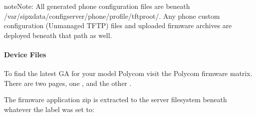 \documentclass[letterpaper,10pt,english]{sphinxmanual}
\begin{document}
\begin{sphinxadmonition}{note}{Note:}
All generated phone configuration files are beneath /var/sipxdata/configserver/phone/profile/tftproot/.
Any phone custom configuration (Unmanaged TFTP) files and uploaded firmware archives are deployed beneath that path as well.
\end{sphinxadmonition}


\paragraph{Device Files}
\label{\detokenize{webui:device-files}}\begin{quote}

\end{quote}

To find the latest GA for your model Polycom visit the Polycom firmware matrix.
There are two pages, one ,
and the other .



The firmware application zip is extracted to the server filesystem beneath whatever the label was set to:

\begin{sphinxVerbatim}[commandchars=\\\{\}]
 
         
         
\end{sphinxVerbatim}
\end{document}
